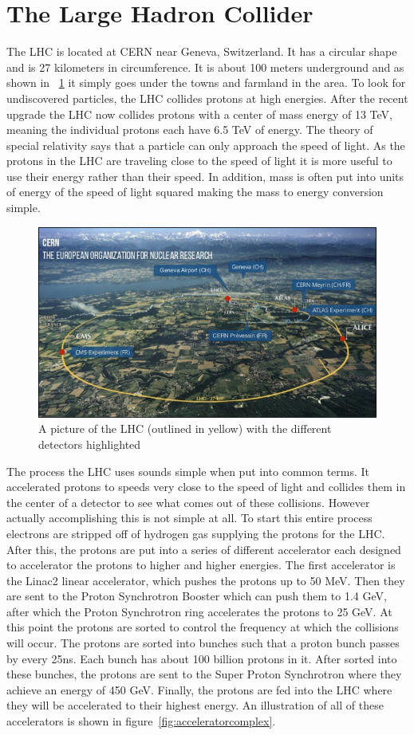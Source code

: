 
\section{The Large Hadron Collider}

The LHC is located at CERN near Geneva, Switzerland. It has a circular shape and is 27 kilometers in circumference. It is about 100 meters underground and as shown in ~\ref{fig:LHC} it simply goes under the towns and farmland in the area. To look for undiscovered particles, the LHC collides protons at high energies. After the recent upgrade the LHC now collides protons with a center of mass energy of 13 TeV, meaning the individual protons each have 6.5 TeV of energy. The theory of special relativity says that a particle can only approach the speed of light. As the protons in the LHC are traveling close to the speed of light it is more useful to use their energy rather than their speed. In addition, mass is often put into units of energy of the speed of light squared making the mass to energy conversion simple. 

\begin{figure}
\centering
\includegraphics[width=0.8\linewidth]{Figures/LHC.png}
\caption{A picture of the LHC (outlined in yellow) with the different detectors highlighted}
\label{fig:LHC}
\end{figure}

The process the LHC uses sounds simple when put into common terms. It accelerated protons to speeds very close to the speed of light and collides them in the center of a detector to see what comes out of these collisions. However actually accomplishing this is not simple at all. To start this entire process electrons are stripped off of hydrogen gas supplying the protons for the LHC. After this, the protons are put into a series of different accelerator each designed to accelerator the protons to higher and higher energies. The first accelerator is the Linac2 linear accelerator, which pushes the protons up to 50 MeV. Then they are sent to the Proton Synchrotron Booster which can push them to 1.4 GeV, after which the Proton Synchrotron ring accelerates the protons to 25 GeV. At this point the protons are sorted to control the frequency at which the collisions will occur. The protons are sorted into bunches such that a proton bunch passes by every 25ns. Each bunch has about 100 billion protons in it. After sorted into these bunches, the protons are sent to the Super Proton Synchrotron where they achieve an energy of 450 GeV. Finally, the protons are fed into the LHC where they will be accelerated to their highest energy. An illustration of all of these accelerators is shown in figure~\ref{fig:acceleratorcomplex}.

